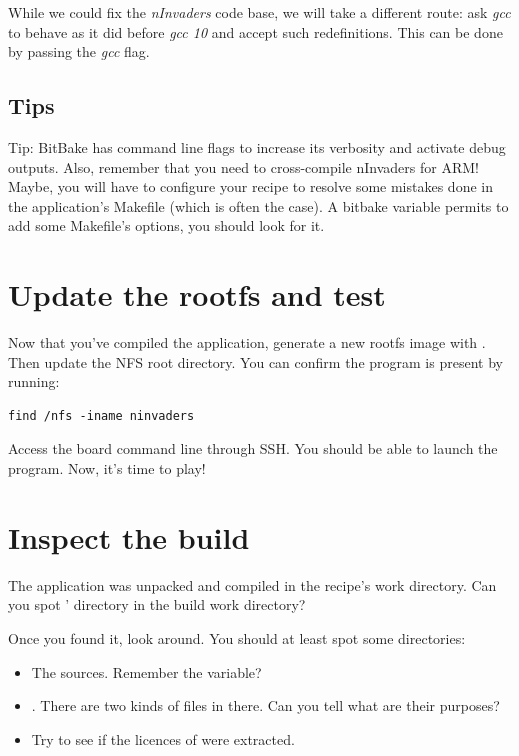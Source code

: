 While we could fix the {\em nInvaders} code base, we will take a
different route: ask {\em gcc} to behave as it did before {\em gcc 10}
and accept such redefinitions. This can be done by passing the
 {\em gcc} flag.

\subsection{Tips}

Tip: BitBake has command line flags to increase its verbosity and activate debug
outputs. Also, remember that you need to cross-compile nInvaders for ARM! Maybe,
you will have to configure your recipe to resolve some mistakes done in the
application's Makefile (which is often the case). A bitbake variable permits
to add some Makefile's options, you should look for it.

\section{Update the rootfs and test}

Now that you've compiled the  application, generate a new
rootfs image with . Then update the
NFS root directory. You can confirm the  program is
present by running:
\begin{verbatim}
find /nfs -iname ninvaders
\end{verbatim}

Access the board command line through SSH. You should be able to
launch the  program. Now, it's time to play!

\section{Inspect the build}

The  application was unpacked and compiled in the
recipe's work directory. Can you spot ' directory in
the build work directory?

Once you found it, look around. You should at least spot some
directories:
\begin{itemize}
    \item The sources. Remember the  variable?
    \item {}. There are two kinds of files in there. Can you
      tell what are their purposes?
    \item Try to see if the licences of  were
      extracted.
\end{itemize}
